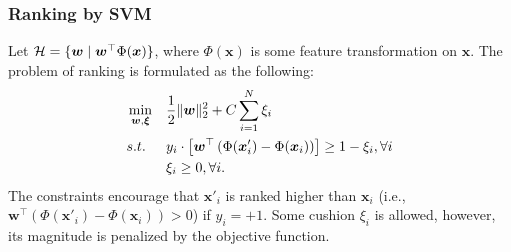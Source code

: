     \subsubsection{Ranking by SVM}
        Let $\mathcal{H}=\{ \bm{w} \mid \bm{w}^\top \Phi(\bm{x}) \}$, where $\Phi(\bm{x})$ is some feature transformation on $\bm{x}$.
        The problem of ranking is formulated as the following:
            \begin{equation}
                \begin{aligned}
                    & \min_{\bm{w}, \bm{\xi}} & & \frac{1}{2}\lVert\bm{w}\rVert_2^2 + C \sum_{i=1}^{N}{\xi_i} \\
                    & s.t. & & y_i \cdot \left[ \bm{w}^\top \left( \Phi(\bm{x}'_i) - \Phi(\bm{x}_i) \right) \right] \ge 1 - \xi_i, \forall i \\
                    & & & \xi_i \ge 0, \forall i.
                \end{aligned}
            \end{equation}
        The constraints encourage that $\bm{x}'_i$ is ranked higher than $\bm{x}_i$ (i.e., $\bm{w}^\top \left( \Phi(\bm{x}'_i) - \Phi(\bm{x}_i) \right) > 0$) if $y_i=+1$.
        Some cushion $\xi_i$ is allowed, however, its magnitude is penalized by the objective function.


